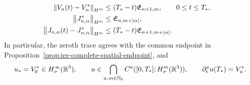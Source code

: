 \begin{theorem}
\begin{align}
 \label{eq:ier-endpoint-velocity-size}\\
 \left\lVert V_n(t)-V_n^*\right\rVert_{H^m}
 &\le(T_*-t)\mathfrak E_{n+1,m},
 \qquad0\le t\le T_*,
 \label{eq:ier-endpoint-velocity-modulus}\\
 \left\lVert J_{n,\alpha}^*\right\rVert_{H^m}
 &\le\mathfrak E_{n,m+|\alpha|},
 \label{eq:ier-endpoint-mixed-size}\\
 \left\lVert J_{n,\alpha}(t)-J_{n,\alpha}^*\right\rVert_{H^m}
 &\le(T_*-t)\mathfrak E_{n+1,m+|\alpha|}.
 \label{eq:ier-endpoint-mixed-modulus}
\end{align}
 In particular, the zeroth trace agrees with the common endpoint in
 Proposition~\ref{prop:ier-complete-spatial-endpoint}, and
\begin{equation}
 u_*=V_0^*\in H^\infty_\sigma(\mathbb R^3),
 \qquad
 u\in\bigcap_{a,m\in\mathbb N_0}C^a([0,T_*];H^m_\sigma(\mathbb R^3)),
 \qquad
 \partial_t^au(T_*)=V_a^*.
 \label{eq:ier-complete-left-velocity-jet}
\end{equation}
\end{theorem}

